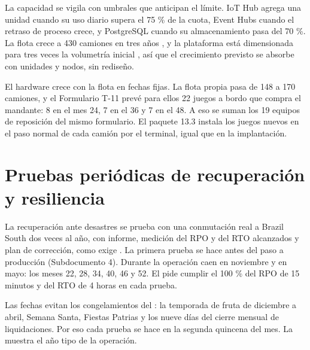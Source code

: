 La capacidad se vigila con umbrales que anticipan el límite. IoT Hub agrega una unidad cuando su uso
diario supera el 75 \% de la cuota, Event Hubs cuando el retraso de proceso crece, y PostgreSQL cuando su
almacenamiento pasa del 70 \%. La flota crece a 430 camiones en tres años , y la
plataforma está dimensionada para tres veces la volumetría inicial , así que el
crecimiento previsto se absorbe con unidades y nodos, sin rediseño.

El hardware crece con la flota en fechas fijas. La flota propia pasa de 148 a 170 camiones, y el
Formulario T-11 prevé para ellos 22 juegos a bordo que compra el mandante: 8 en el mes 24, 7 en el 36 y
7 en el 48. A eso se suman los 19 equipos de reposición del mismo formulario. El paquete 13.3 instala los juegos nuevos en el paso normal de cada camión por el terminal,
igual que en la implantación.

\section{Pruebas periódicas de recuperación y resiliencia}\label{sec:11-pruebas-periodicas-de-recuperaci}

La recuperación ante desastres se prueba con una conmutación real a Brazil South dos veces al año, con
informe, medición del RPO y del RTO alcanzados y plan de corrección, como exige
. La primera prueba se hace antes del paso a producción (Subdocumento 4). Durante
la operación caen en noviembre y en mayo: los meses 22, 28, 34, 40, 46 y 52. El  pide
cumplir el 100 \% del RPO de 15 minutos y del RTO de 4 horas en cada prueba.

Las fechas evitan los congelamientos del : la temporada de fruta de diciembre a
abril, Semana Santa, Fiestas Patrias y los nueve días del cierre mensual de liquidaciones. Por eso cada
prueba se hace en la segunda quincena del mes. La  muestra el año tipo de la
operación.

